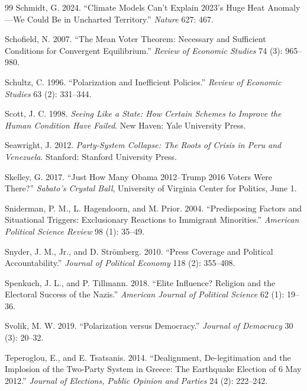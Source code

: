 \documentclass[12pt,letterpaper]{article}
\begin{document}
\begin{thebibliography}{99}
Schmidt, G. 2024. ``Climate Models Can't Explain 2023's Huge Heat Anomaly---We Could Be in Uncharted Territory.'' \textit{Nature} 627: 467.

Schofield, N. 2007. ``The Mean Voter Theorem: Necessary and Sufficient Conditions for Convergent Equilibrium.'' \textit{Review of Economic Studies} 74 (3): 965--980.

Schultz, C. 1996. ``Polarization and Inefficient Policies.'' \textit{Review of Economic Studies} 63 (2): 331--344.

Scott, J. C. 1998. \textit{Seeing Like a State: How Certain Schemes to Improve the Human Condition Have Failed}. New Haven: Yale University Press.

Seawright, J. 2012. \textit{Party-System Collapse: The Roots of Crisis in Peru and Venezuela}. Stanford: Stanford University Press.

Skelley, G. 2017. ``Just How Many Obama 2012--Trump 2016 Voters Were There?'' \textit{Sabato's Crystal Ball}, University of Virginia Center for Politics, June 1.

Sniderman, P. M., L. Hagendoorn, and M. Prior. 2004. ``Predisposing Factors and Situational Triggers: Exclusionary Reactions to Immigrant Minorities.'' \textit{American Political Science Review} 98 (1): 35--49.

Snyder, J. M., Jr., and D. Str\"{o}mberg. 2010. ``Press Coverage and Political Accountability.'' \textit{Journal of Political Economy} 118 (2): 355--408.

Spenkuch, J. L., and P. Tillmann. 2018. ``Elite Influence? Religion and the Electoral Success of the Nazis.'' \textit{American Journal of Political Science} 62 (1): 19--36.

Svolik, M. W. 2019. ``Polarization versus Democracy.'' \textit{Journal of Democracy} 30 (3): 20--32.

Teperoglou, E., and E. Tsatsanis. 2014. ``Dealignment, De-legitimation and the Implosion of the Two-Party System in Greece: The Earthquake Election of 6 May 2012.'' \textit{Journal of Elections, Public Opinion and Parties} 24 (2): 222--242.


\end{thebibliography}
\end{document}
